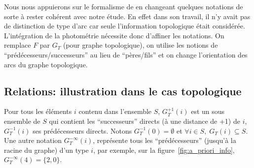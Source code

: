 	Nous nous appuierons sur le formalisme de \citep[Fasquel]{Fasquel2006} en changeant quelques notations de sorte à rester cohérent avec notre étude. En effet dans son travail, il n'y avait pas de distinction de type d'arc car seule l'information topologique était considérée. L'intégration de la photométrie nécessite donc d'affiner les notations. On remplace $F$ par $G_T$ (pour graphe topologique), on utilise les notions de ``prédécesseurs/successeurs'' au lieu de ``pères/fils'' et on change l'orientation des arcs du graphe topologique. %


\subsection{Relations: illustration dans le cas topologique}

	Pour tous les éléments $i$ contenu dans l'ensemble $S$, $G_T^{+1}(i)$ est un sous ensemble de $S$ qui contient les ``successeurs''  directs (à une distance de +1) de $i$, $G_T^{-1}(i)$ ses prédécesseurs directs. Notons $G_T^{-1}(0) = \emptyset$ et $\forall i \in S,\; G_T(i) \subseteq S$. Une autre notation $G_{T}^{-\infty}(i)$, représente tous les ``prédécesseurs'' (jusqu'à la racine du graphe) d'un type $i$, par exemple, sur la figure~\ref{fig:a_priori_info},  $G_{T}^{-\infty}(4)=\{2,0\}$.


